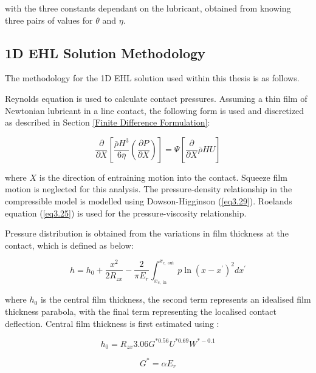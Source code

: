 with the three constants dependant on the lubricant, obtained from knowing three pairs of values for $\theta$ and $\eta$.

\subsection{1D EHL Solution Methodology}

The methodology for the 1D EHL solution used within this thesis is as follows.

Reynolds equation is used to calculate contact pressures. Assuming a thin film of Newtonian lubricant in a line contact, the following form is used and discretized as described in Section \ref{Finite Difference Formulation}:

\begin{equation}\label{eq3.33}
	\frac{\partial}{\partial X}\left[\frac{\bar{\rho} H^3}{6 \bar{\eta}}\left(\frac{\partial P}{\partial X}\right)\right]=\Psi\left[\frac{\partial}{\partial X} \bar{\rho} H U\right]
\end{equation}

where $X$ is the direction of entraining motion into the contact. Squeeze film motion is neglected for this analysis. The pressure-density relationship in the compressible model is modelled using Dowson-Higginson \cite{Dowson1977} (\ref{eq3.29}). Roelands equation \cite{Roelands1966} (\ref{eq3.25}) is used for the pressure-viscosity relationship.

Pressure distribution is obtained from the variations in film thickness at the contact, which is defined as below:

\begin{equation}\label{eq3.34}
	h=h_0+\frac{x^2}{2 R_{z x}}-\frac{2}{\pi E_r} \int_{x_{c, \text { in }}}^{x_{c, \text { out }}} p \ln \left(x-x^{\prime}\right)^2 d x^{\prime}
\end{equation}

where $h_0$ is the central film thickness, the second term represents an idealised film thickness parabola, with the final term representing the localised contact deflection. Central film thickness is first estimated using \cite{Dowson1979}:

\begin{equation}\label{eq3.35}
	h_0=R_{z x} 3.06 G^{* 0.56} U^{* 0.69} W^{*-0.1}
\end{equation}

\begin{equation}\label{eq3.36}
	G^*=\alpha E_r 
\end{equation}

